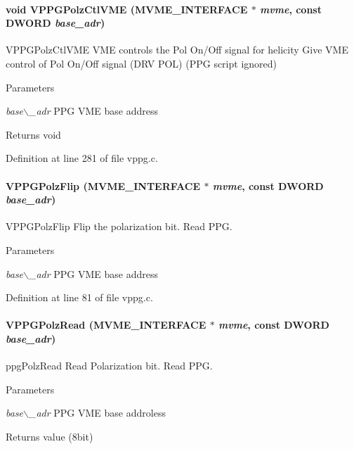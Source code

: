 \paragraph[{VPPGPolzCtlVME}]{\setlength{\rightskip}{0pt plus 5cm}void VPPGPolzCtlVME ({\bf MVME\_\-INTERFACE} $\ast$ {\em mvme}, \/  const {\bf DWORD} {\em base\_\-adr})}\hfill\label{vppg_8h_a070407a7d64392ec20ad840d44ffb01c}
VPPGPolzCtlVME VME controls the Pol On/Off signal for helicity  Give VME control of Pol On/Off signal (DRV POL) (PPG script ignored) 
\begin{DoxyParams}{Parameters}
\item[{\em base$\backslash$\_\-adr}]PPG VME base address \end{DoxyParams}
\begin{DoxyReturn}{Returns}
void 
\end{DoxyReturn}


Definition at line 281 of file vppg.c.
\paragraph[{VPPGPolzFlip}]{ VPPGPolzFlip ({\bf MVME\_\-INTERFACE} $\ast$ {\em mvme}, \/  const {\bf DWORD} {\em base\_\-adr})}\hfill\label{vppg_8h_ae7f3d0874c56189b93a9abde9c337714}
VPPGPolzFlip Flip the polarization bit.  Read PPG. 
\begin{DoxyParams}{Parameters}
\item[{\em base$\backslash$\_\-adr}]PPG VME base address \end{DoxyParams}


Definition at line 81 of file vppg.c.
\paragraph[{VPPGPolzRead}]{ VPPGPolzRead ({\bf MVME\_\-INTERFACE} $\ast$ {\em mvme}, \/  const {\bf DWORD} {\em base\_\-adr})}\hfill\label{vppg_8h_a5250200ded85e3f2e65c941384379ed5}
ppgPolzRead Read Polarization bit.  Read PPG. 
\begin{DoxyParams}{Parameters}
\item[{\em base$\backslash$\_\-adr}]PPG VME base addroless \end{DoxyParams}
\begin{DoxyReturn}{Returns}
value (8bit) 
\end{DoxyReturn}


